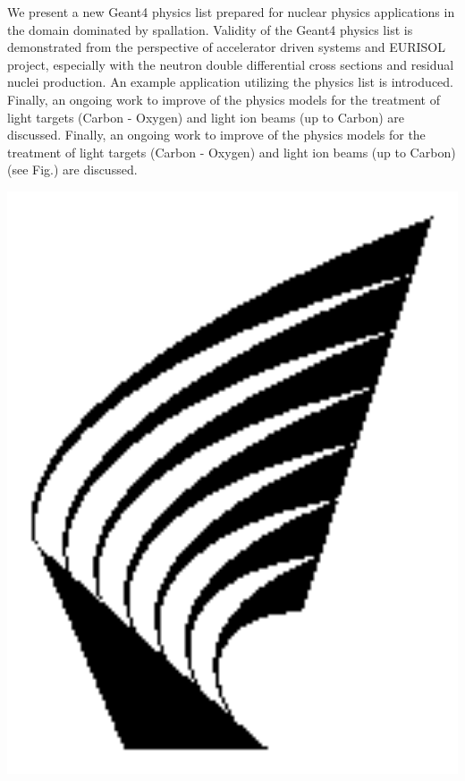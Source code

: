 \documentclass[12pt]{article}
\begin{document}
\begin{minipage}{9cm}
We present a new Geant4 physics list prepared for nuclear physics applications
in the domain dominated by spallation.
Validity of the Geant4 physics list is demonstrated from the perspective of accelerator driven systems
and EURISOL project, especially with the neutron double differential cross sections and residual
nuclei production.
An example application utilizing the physics list is introduced.
%
Finally, an ongoing work to improve of the physics models for the treatment of 
light targets (Carbon - Oxygen) and light ion beams (up to Carbon) are discussed.
Finally, an ongoing work to improve of the physics models for the treatment of 
light targets (Carbon - Oxygen) and light ion beams (up to Carbon) (see Fig.) are discussed.
\end{minipage}
\hfill
\begin{minipage}{5cm}



\includegraphics[width=1.0\textwidth]{logo.eps}

\end{minipage}
\end{document}
